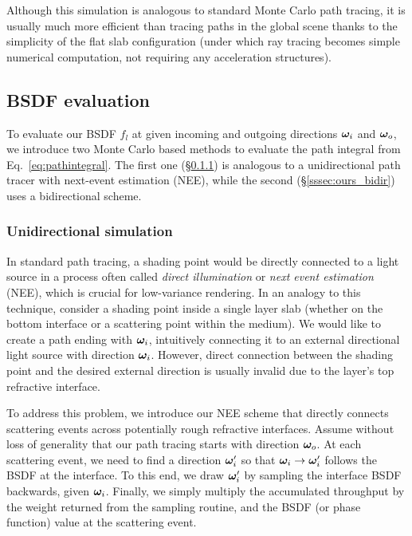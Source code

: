 Although this simulation is analogous to standard Monte Carlo path tracing, it is usually much more efficient than tracing paths in the global scene thanks to the simplicity of the flat slab configuration (under which ray tracing becomes simple numerical computation, not requiring any acceleration structures).

\subsection{BSDF evaluation}
\label{subsec:ours_eval}
%
To evaluate our BSDF $f_l$ at given incoming and outgoing directions $\bm{\omega}_i$ and $\bm{\omega}_o$, we introduce two Monte Carlo based methods to evaluate the path integral from Eq.~\eqref{eq:pathintegral}.
The first one (\S\ref{sssec:ours_unidir}) is analogous to a unidirectional path tracer with next-event estimation (NEE), while the second (\S\ref{sssec:ours_bidir}) uses a bidirectional scheme.

\subsubsection{Unidirectional simulation}
\label{sssec:ours_unidir}
%
In standard path tracing, a shading point would be directly connected to a light source in a process often called \emph{direct illumination} or \emph{next event estimation} (NEE), which is crucial for low-variance rendering. In an analogy to this technique, consider a shading point inside a single layer slab (whether on the bottom interface or a scattering point within the medium). We would like to create a path ending with $\bm{\omega}_i$, intuitively connecting it to an external directional light source with direction $\bm{\omega}_i$. However, direct connection between the shading point and the desired external direction is usually invalid due to the layer's top refractive interface.

To address this problem, we introduce our NEE scheme that directly connects scattering events across potentially rough refractive interfaces.
Assume without loss of generality that our path tracing starts with direction $\bm{\omega}_o$.
At each scattering event, we need to find a direction $\bm{\omega}_i'$ so that $\bm{\omega}_i \to \bm{\omega}_i'$ follows the BSDF at the interface.
To this end, we draw $\bm{\omega}_i'$ by sampling the interface BSDF backwards, given $\bm{\omega}_i$.
Finally, we simply multiply the accumulated throughput by the weight returned from the sampling routine, and the BSDF (or phase function) value at the scattering event.

